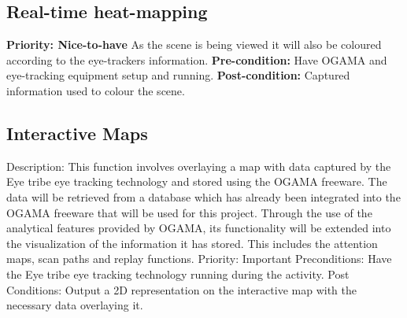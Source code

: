 \subsection{Real-time heat-mapping}
    \textbf{Priority: Nice-to-have}\newline
    As the scene is being viewed it will also be coloured according to the eye-trackers information.\newline
    \textbf{Pre-condition: }
    Have OGAMA and eye-tracking equipment setup and running.\newline
    \textbf{Post-condition: }
    Captured information used to colour the scene.
\subsection{Interactive Maps}
Description: This function involves overlaying a map with data captured by the Eye tribe eye tracking technology and stored using the OGAMA freeware. The data will be retrieved from a database which has already been integrated into the OGAMA freeware that will be used for this project. Through the use of the analytical features provided by OGAMA, its functionality will be extended into the visualization of the information it has stored. This includes the attention maps, scan paths and replay functions.
Priority: Important
Preconditions: Have the Eye tribe eye tracking technology running during the activity.     
Post Conditions: Output a 2D representation on the interactive map with the necessary data overlaying it. 
